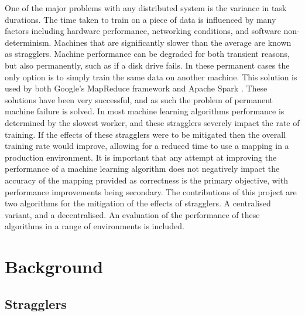 \documentclass[12pt]{article}
\begin{document}
\newline
\newline
One of the major problems with any distributed system is the variance in task durations. The time taken to train on a piece of data is influenced by many factors including hardware performance, networking conditions, and software non-determinism. Machines that are significantly slower than the average are known as stragglers. Machine performance can be degraded for both transient reasons, but also permanently, such as if a disk drive fails. In these permanent cases the only option is to simply train the same data on another machine. This solution is used by both Google's MapReduce framework  \citep{dean2008mapreduce} and Apache Spark \cite{zaharia2012resilient}. These solutions have been very successful, and as such the problem of permanent machine failure is solved. 
\newline
\newline
In most machine learning algorithms performance is determined by the slowest worker, and these stragglers severely impact the rate of training. If the effects of these stragglers were to be mitigated then the overall training rate would improve, allowing for a reduced time to use a mapping in a production environment. It is important that any attempt at improving the performance of a machine learning algorithm does not negatively impact the accuracy of the mapping provided as correctness is the primary objective, with performance improvements being secondary.
\newline
\newline
The contributions of this project are two algorithms for the mitigation of the effects of stragglers. A centralised variant, and a decentralised. An evaluation of the performance of these algorithms in a range of environments is included.

\newpage

\section{Background}

\subsection{Stragglers}
\end{document}
